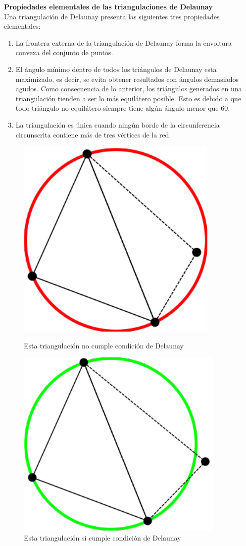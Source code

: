 \documentclass[12pt]{report}
\begin{document}
		{\large{\textbf{Propiedades elementales de las triangulaciones de Delaunay}}}\\

	Una triangulación de Delaunay presenta las siguientes tres propiedades elementales:
	
	\begin{enumerate}
		\item La frontera externa de la triangulación de Delaunay forma la envoltura convexa del conjunto de puntos.
		\item El ángulo mínimo dentro de todos los triángulos de Delaunay esta maximizado, es decir, se evita obtener resultados con ángulos demasiados agudos. Como consecuencia de lo anterior, los triángulos generados en una triangulación tienden a ser lo más equilátero posible. Esto  es debido a que todo triángulo no equilátero siempre tiene algún ángulo menor que 60{\degree }.
		\item La triangulación es única cuando ningún borde de la circunferencia circunscrita contiene más de tres vértices de la red. 
	
	\end{enumerate}
		

	
	\begin{figure}[h]
		\centering
		\begin{minipage}{0.45\textwidth}
			\centering
			\includegraphics[width=0.44\linewidth]{no_td.png}  %
			\caption{Esta triangulación no cumple condición de Delaunay}
			\label{no_cumple}
			
		\end{minipage}\hfill
		\begin{minipage}{0.45\textwidth}
			\centering
			\includegraphics[width=0.5\linewidth]{si_td.png}  %
			\caption{Esta triangulación sí cumple condición de Delaunay}
			\label{cumple}
		\end{minipage}
	\end{figure}
\end{document}
